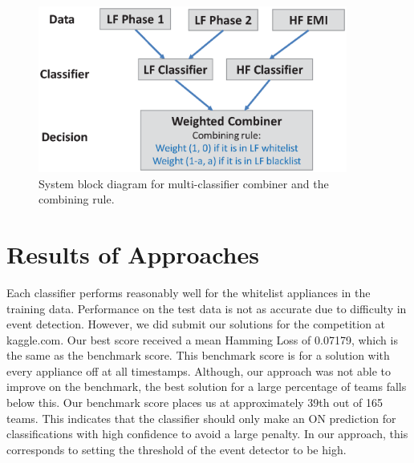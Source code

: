 \documentclass[11pt, letterpaper]{article}
\begin{document}
\begin{figure}[H]
\begin{center}
\includegraphics[width=4.0in]{block_diagram.eps}
  \caption{System block diagram for multi-classifier combiner and the combining rule.}
  \label{fig:block_diagram}
\end{center}
\vskip -15pt
\end{figure}
\section{Results of Approaches}

Each classifier performs reasonably well for the whitelist appliances in the training data.  Performance on the test data is not as accurate due to difficulty in event detection.  However, we did submit our  solutions for the competition at kaggle.com.  Our best score received a mean Hamming Loss of 0.07179, which is the same as the benchmark score.  This benchmark score is for a solution with every appliance off at all timestamps.  Although, our approach was not able to improve on the benchmark, the best solution for a large percentage of teams falls below this.  Our benchmark score places us at approximately 39th out of 165 teams.  This indicates that the classifier should only make an ON prediction for classifications with high confidence to avoid a large penalty. In our approach, this corresponds to setting the threshold of the event detector to be high. 
\end{document}
